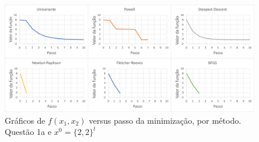 \documentclass[10pt, a4paper]{article}
\begin{document}
\begin{figure}[H]
  \centering
  \includegraphics[scale=0.45]{figuras/q1a_fxpassos_P1.PNG}
  \caption{Gráficos de $f(x_1,x_2)$ versus passo da minimização, por método. Questão 1a e $x^0 = \{2,2\}^t$}
\end{figure}
\end{document}
